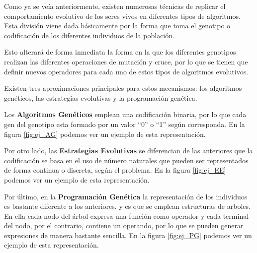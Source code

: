 Como ya se veía anteriormente, existen numerosas técnicas de replicar el comportamiento evolutivo de los seres vivos en diferentes tipos de algoritmos. Esta división viene dada básicamente por la forma que toma el genotipo o codificación de los diferentes individuos de la población.

Esto alterará de forma inmediata la forma en la que los diferentes genotipos realizan las diferentes operaciones de mutación y cruce, por lo que se tienen que definir nuevos operadores para cada uno de estos tipos de algoritmos evolutivos.

Existen tres aproximaciones principales para estos mecanismos: los algoritmos genéticos, las estrategias evolutivas y la programación genética.

Los \textbf{Algoritmos Genéticos} \cite{Holland1984} emplean una codificación binaria, por lo que cada gen del genotipo esta formado por un valor ``0'' o ``1'' según corresponda. En la figura \ref{fig:ej_AG} podemos ver un ejemplo de esta representación.

Por otro lado, las \textbf{Estrategias Evolutivas} \cite{Beyer2002} se diferencian de las anteriores que la codificación se basa en el uso de número naturales que pueden ser representados de forma continua o discreta, según el problema. En la figura \ref{fig:ej_EE} podemos ver un ejemplo de esta representación.

Por último, en la \textbf{Programación Genética} \cite{koza1992genetic} la representación de los individuos es bastante diferente a los anteriores, y es que se emplean estructuras de arboles. En ella cada nodo del árbol expresa una función como operador y cada terminal del nodo, por el contrario, contiene un operando, por lo que se pueden generar expresiones de manera bastante sencilla. En la figura \ref{fig:ej_PG} podemos ver un ejemplo de esta representación.

